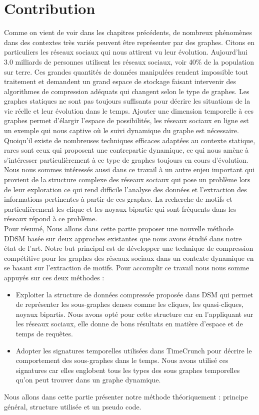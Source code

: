 \chapter{Contribution}
Comme on vient de voir dans les chapitres précédents, de nombreux phénomènes dans des contextes très variés peuvent être représenter par des graphes. Citons en particuliers les réseaux sociaux qui nous attirent vu leur évolution. Aujourd'hui 3.0 milliards de personnes utilisent les réseaux sociaux, voir 40\% de la population sur terre. Ces grandes quantités de données manipulées rendent impossible tout traitement et demandent un grand espace de stockage faisant intervenir des algorithmes de compression adéquats qui changent selon le type de graphes. 
Les graphes statiques ne sont pas toujours suffisants pour décrire les situations de la vie réelle et leur évolution dans le temps. Ajouter une dimension temporelle à ces graphes permet d'élargir l'espace de possibilités, les réseaux sociaux en ligne est un exemple qui nous captive où le suivi dynamique du graphe est nécessaire. Quoiqu'il existe de nombreuses techniques efficaces adaptées au contexte statique, rares sont ceux qui proposent une contrepartie dynamique, ce qui nous amène à s'intéresser particulièrement à ce type de graphes toujours en cours d'évolution. Nous nous sommes intéressés aussi dans ce travail à un autre enjeu important qui provient de la structure complexe des réseaux sociaux qui pose un problème lors de leur exploration ce qui rend difficile l'analyse des données et l'extraction des informations pertinentes à partir de ces graphes. La recherche de motifs et particulièrement les clique et les noyaux bipartie qui sont fréquents dans les réseaux répond à ce problème.\\
Pour résumé, Nous allons dans cette partie proposer une nouvelle méthode DDSM basée sur deux approches existantes que nous avons étudié dans notre état de l'art. Notre but principal est de développer une technique de compression compétitive pour les graphes des réseaux sociaux dans un contexte dynamique en se basant sur l'extraction de motifs. Pour accomplir ce travail nous nous somme appuyés sur ces deux méthodes :
\begin{itemize}
\item Exploiter la structure de données compressée proposée dans DSM \citep{hernandez2014compressed} qui permet de représenter les sous-graphes denses comme les cliques, les quasi-cliques, noyaux bipartis. Nous avons opté pour cette structure car en l'appliquant sur les réseaux sociaux, elle donne de bons résultats en matière d'espace et de temps de requêtes.  
\item Adopter les signatures temporelles utilisées dans TimeCrunch \citep{shah2015timecrunch} pour décrire le comportement des sous-graphes dans le temps. Nous avons utilisé ces signatures car elles englobent tous les types des sous graphes temporelles qu'on peut trouver dans un graphe dynamique.
\end{itemize}	
Nous allons dans cette partie présenter notre méthode théoriquement : principe général, structure utilisée et un pseudo code.	
		
